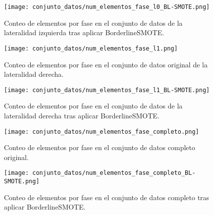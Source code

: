 \begin{figure}[H]
    \centering
     \texttt{[image: conjunto\_datos/num\_elementos\_fase\_l0\_BL-SMOTE.png]}
     \label{fig:l0-over}
    \caption{Conteo de elementos por fase en el conjunto de datos de la lateralidad izquierda tras aplicar BorderlineSMOTE.}
\end{figure}

\begin{figure}[H]
    \centering
	  \texttt{[image: conjunto\_datos/num\_elementos\_fase\_l1.png]}
     \label{fig:l1-orig}
    \caption{Conteo de elementos por fase en el conjunto de datos original de la lateralidad derecha.}

\end{figure}

\begin{figure}[H]
    \centering
     \texttt{[image: conjunto\_datos/num\_elementos\_fase\_l1\_BL-SMOTE.png]}
     \label{fig:l1-over}
    \caption{Conteo de elementos por fase en el conjunto de datos de la lateralidad derecha tras aplicar BorderlineSMOTE.}
\end{figure}



\begin{figure}[H]
    \centering
	  \texttt{[image: conjunto\_datos/num\_elementos\_fase\_completo.png]}
     \label{fig:l1-orig}
    \caption{Conteo de elementos por fase en el conjunto de datos completo original.}

\end{figure}

\begin{figure}[H]
    \centering
     \texttt{[image: conjunto\_datos/num\_elementos\_fase\_completo\_BL-SMOTE.png]}
     \label{fig:l1-over}
    \caption{Conteo de elementos por fase en el conjunto de datos completo tras aplicar BorderlineSMOTE.}
\end{figure}
